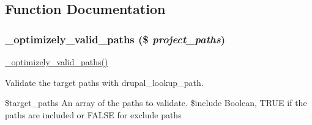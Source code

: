 \subsection{Function Documentation}
\hypertarget{optimizely_8admin_8inc_a78118fa72426111d4861e98386e3192d}{
\subsubsection[{\_\-optimizely\_\-valid\_\-paths}]{\setlength{\rightskip}{0pt plus 5cm}\_\-optimizely\_\-valid\_\-paths (\$ {\em project\_\-paths})}}
\label{optimizely_8admin_8inc_a78118fa72426111d4861e98386e3192d}
\hyperlink{optimizely_8admin_8inc_a78118fa72426111d4861e98386e3192d}{\_\-optimizely\_\-valid\_\-paths()}

Validate the target paths with drupal\_\-lookup\_\-path.

\$target\_\-paths An array of the paths to validate.  \$include Boolean, TRUE if the paths are included or FALSE for exclude paths

